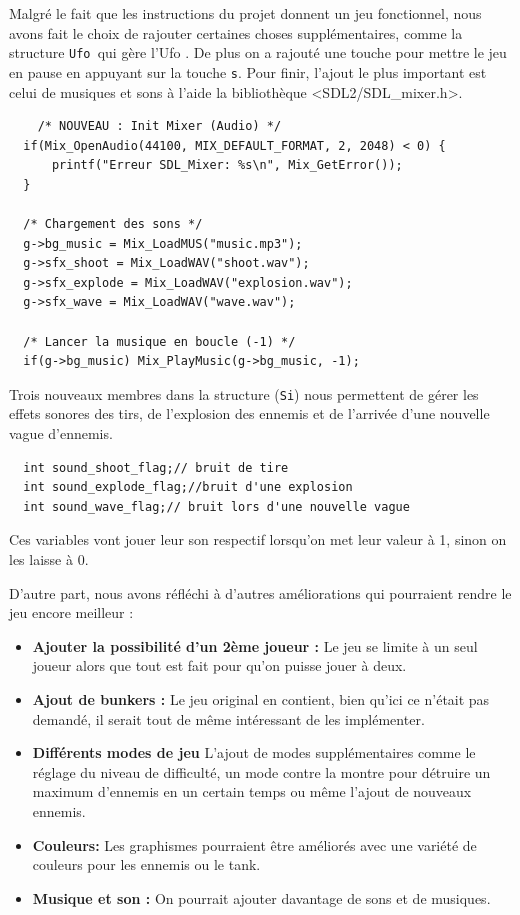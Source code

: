 \documentclass[12pt,a4paper]{report}
\begin{document}
Malgré le fait que les instructions du projet donnent un jeu fonctionnel, nous avons fait le choix de rajouter certaines choses supplémentaires, comme la structure \texttt{Ufo }qui gère l'Ufo . De plus on a rajouté une touche pour mettre le jeu en pause en appuyant sur la touche \texttt{s}. 
Pour finir, l'ajout le plus important est celui de musiques et sons à l'aide la bibliothèque <SDL2/SDL\_mixer.h>.
\begin{lstlisting}
    /* NOUVEAU : Init Mixer (Audio) */
  if(Mix_OpenAudio(44100, MIX_DEFAULT_FORMAT, 2, 2048) < 0) {
      printf("Erreur SDL_Mixer: %s\n", Mix_GetError());
  }

  /* Chargement des sons */
  g->bg_music = Mix_LoadMUS("music.mp3");
  g->sfx_shoot = Mix_LoadWAV("shoot.wav");
  g->sfx_explode = Mix_LoadWAV("explosion.wav");
  g->sfx_wave = Mix_LoadWAV("wave.wav");

  /* Lancer la musique en boucle (-1) */
  if(g->bg_music) Mix_PlayMusic(g->bg_music, -1);
\end{lstlisting}
Trois nouveaux membres dans la structure (\texttt{Si}) nous permettent de gérer les effets sonores des tirs, de l'explosion des ennemis et de l'arrivée d'une nouvelle vague d'ennemis. 
\begin{lstlisting}
  int sound_shoot_flag;// bruit de tire
  int sound_explode_flag;//bruit d'une explosion
  int sound_wave_flag;// bruit lors d'une nouvelle vague
\end{lstlisting}
Ces variables vont jouer leur son respectif lorsqu'on met leur valeur à 1, sinon on les laisse à 0.

\vspace{0.5cm}
D'autre part, nous avons réfléchi à d'autres améliorations qui pourraient rendre le jeu encore meilleur : 
\begin{itemize}
    \item \textbf{Ajouter la possibilité d'un 2ème joueur :} Le jeu se limite à un seul joueur alors que tout est fait pour qu'on puisse jouer à deux.
    \item\textbf{Ajout de bunkers :} Le jeu original en contient, bien qu'ici ce n'était pas demandé, il serait tout de même intéressant de les implémenter.
    \item \textbf{Différents modes de jeu} L'ajout de modes supplémentaires comme le réglage du niveau de difficulté, un mode contre la montre pour détruire un maximum d'ennemis en un certain temps ou même l'ajout de nouveaux ennemis. 
    \item \textbf{Couleurs:} Les graphismes pourraient être améliorés avec une variété de couleurs pour les ennemis ou le tank.
    \item \textbf{Musique et son :} On pourrait ajouter davantage de sons et de musiques. 
    
\end{itemize}
\end{document}
